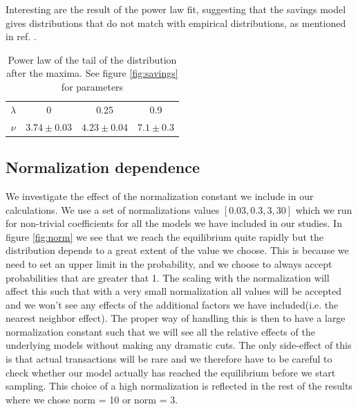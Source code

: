 \documentclass[a4paper,11pt]{article}
\begin{document}
{Interesting are the result of the power law fit, suggesting that the savings model gives distributions that do not match with empirical distributions, as mentioned in ref. \cite{AgentBasedModels}.

\begin{table}[h]
\caption{Power law of the tail of the distribution after the maxima. See figure \ref{fig:savings} for parameters}
\begin{center}
\begin{tabular}{c|c|c|c}
$\lambda$ & 0 & 0.25 & 0.9 \\
$\nu$ & $3.74\pm 0.03$ & $4.23\pm 0.04$ & $7.1\pm0.3$
\end{tabular}
\end{center}
\label{tab:savings}
\end{table}%


\subsection{Normalization dependence}
We investigate the effect of the normalization constant we include in our calculations. We use a set of normalizations values $[0.03,0.3,3,30]$ which we run for non-trivial coefficients for all the models we have included in our studies. In figure \ref{fig:norm} we see that we reach the equilibrium quite rapidly but the distribution depends to a great extent of the value we choose. This is because we need to set an upper limit in the probability, and we choose to always accept probabilities that are greater that 1. The scaling with the normalization will affect this such that with a very small normalization all values will be accepted and we won't see any effects of the additional factors we have included(i.e. the nearest neighbor effect). The proper way of handling this is then to have a large normalization constant such that we will see all the relative effects of the underlying models without making any dramatic cuts. The only side-effect of this is that actual transactions will be rare and we therefore have to be careful to check whether our model actually has reached the equilibrium before we start sampling. This choice of a high normalization is reflected in the rest of the results where we chose norm = 10 or norm = 3. 

}
\end{document}
